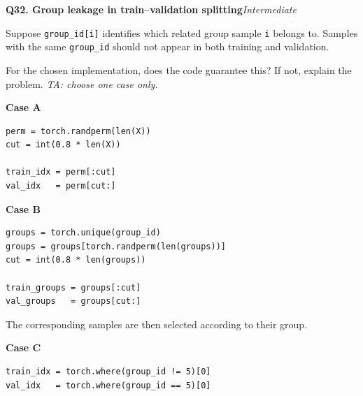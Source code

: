 \documentclass[11pt]{article}
\newif\ifshowanswers
\newenvironment{question}[3]{%
  \par\medskip
  \noindent\textbf{Q#1. #2}\hfill\textit{#3}\par\smallskip
}{\par\medskip}
\newcommand{\answer}[1]{%
  \ifshowanswers
    \begin{quote}\small\textbf{Expected answer:} #1\end{quote}
  \fi
}
\newcommand{\marking}[1]{%
  \ifshowanswers
    \begin{quote}\small\textbf{1 mark:} #1\end{quote}
  \fi
}
\newcommand{\casesnote}{\textit{TA: choose one case only.}}
\begin{document}
\begin{question}{32}{Group leakage in train--validation splitting}{Intermediate}
Suppose \texttt{group\_id[i]} identifies which related group sample
\texttt{i} belongs to. Samples with the same \texttt{group\_id} should not
appear in both training and validation.

For the chosen implementation, does the code guarantee this? If not, explain
the problem. \casesnote

\textbf{Case A}
\begin{verbatim}
perm = torch.randperm(len(X))
cut = int(0.8 * len(X))

train_idx = perm[:cut]
val_idx   = perm[cut:]
\end{verbatim}

\textbf{Case B}
\begin{verbatim}
groups = torch.unique(group_id)
groups = groups[torch.randperm(len(groups))]
cut = int(0.8 * len(groups))

train_groups = groups[:cut]
val_groups   = groups[cut:]
\end{verbatim}

The corresponding samples are then selected according to their group.

\textbf{Case C}
\begin{verbatim}
train_idx = torch.where(group_id != 5)[0]
val_idx   = torch.where(group_id == 5)[0]
\end{verbatim}

\answer{
Case A: No. It randomly splits individual samples, so samples belonging to the
same group may appear in both training and validation. This can give an
overly optimistic validation result.

Case B: Yes. The split is performed on unique groups first, so an entire group
is assigned to only one split.

Case C: There is no group overlap between the two sets, so it avoids that
specific leakage. However, it uses only one group for validation and therefore
may be a poor or unrepresentative validation split.
}

\marking{Student correctly judges whether the chosen implementation separates
related groups and explains the consequence of any problem.}
\end{question}
\end{document}
